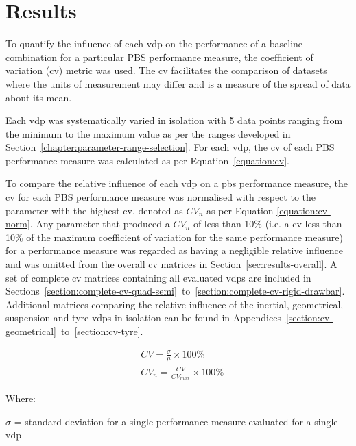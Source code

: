 \chapter{Results}\label{chapter:results}

To quantify the influence of each \gls{vdp} on the performance of a baseline combination for a particular PBS performance measure, the coefficient of variation (\gls{cv}) metric was used. The \gls{cv} facilitates the comparison of datasets where the units of measurement may differ \cite{Soong2004} and is a measure of the spread of data about its mean.

Each \gls{vdp} was systematically varied in isolation with 5 data points ranging from the minimum to the maximum value as per the ranges developed in Section~\ref{chapter:parameter-range-selection}. For each \gls{vdp}, the \gls{cv} of each PBS performance measure was calculated as per Equation~\ref{equation:cv}.

To compare the relative influence of each \gls{vdp} on a \gls{pbs} performance measure, the \gls{cv} for each PBS performance measure was normalised with respect to the parameter with the highest \gls{cv}, denoted as $CV_n$ as per Equation \ref{equation:cv-norm}. Any parameter that produced a $CV_n$ of less than 10\% (i.e. a \gls{cv} less than 10\% of the maximum coefficient of variation for the same performance measure) for a performance measure was regarded as having a negligible relative influence and was omitted from the overall \gls{cv} matrices in Section~\ref{sec:results-overall}. A set of complete \gls{cv} matrices containing all evaluated \glspl{vdp} are included in Sections~\ref{section:complete-cv-quad-semi}~to~\ref{section:complete-cv-rigid-drawbar}. Additional matrices comparing the relative influence of the inertial, geometrical, suspension and tyre \glspl{vdp} in isolation can be found in Appendices~\ref{section:cv-geometrical}~to~\ref{section:cv-tyre}.


\begin{align}
    \label{equation:cv}
    &CV = \frac{\sigma}{\mu} \times 100\%\\
    \label{equation:cv-norm}
    &CV_{n} = \frac{CV}{CV_{max}} \times 100\%
\end{align}

Where:

$\sigma$ = standard deviation for a single performance measure evaluated for a single \gls{vdp}

